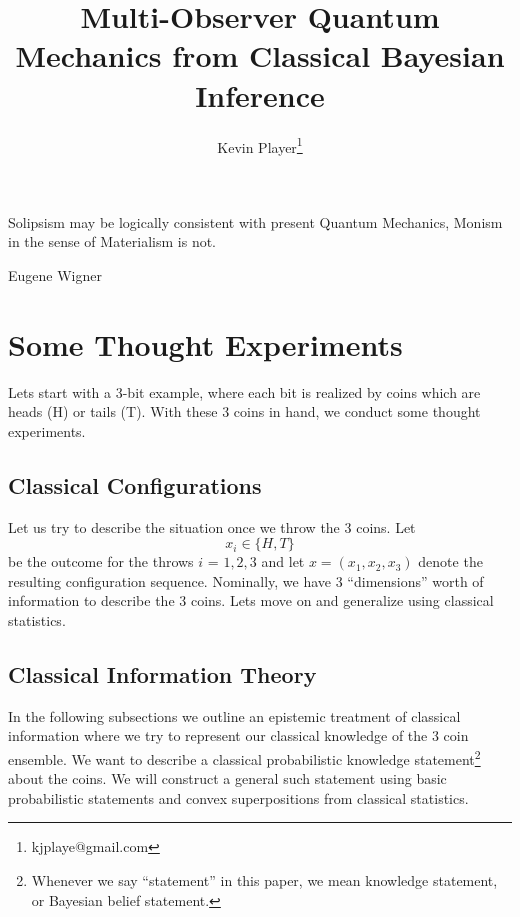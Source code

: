 \documentclass[12pt,a4paper]{article}
\begin{document}
\title{Multi-Observer Quantum Mechanics from Classical Bayesian Inference}
\author[1]{Kevin Player\footnote{kjplaye@gmail.com}}

\maketitle


\epigraph{Solipsism may be logically consistent with present Quantum Mechanics, Monism in the sense of Materialism is not.}{Eugene Wigner}


\section{Some Thought Experiments}
Lets start with a 3-bit example, where each bit is realized by coins which are heads (H) or tails (T).  With these 3 coins in hand, we conduct some thought experiments.
\subsection{Classical Configurations}
Let us try to describe the situation once we throw the 3 coins.  Let
\[
x_i \in \{H,T\}
\]
be the outcome for the throws $i$ = $1,2,3$ and let $x = (x_1, x_2, x_3)$ denote the resulting configuration sequence.  Nominally, we have 3 ``dimensions'' worth of information to describe the 3 coins.  Lets move on and generalize using classical statistics.
  
\subsection{Classical Information Theory}
In the following subsections we outline an epistemic treatment of classical information where we try to represent our classical knowledge of the 3 coin ensemble. We want to describe a classical probabilistic knowledge statement\footnote{Whenever we say ``statement'' in this paper, we mean knowledge statement, or Bayesian belief statement.} about the coins.  We will construct a general such statement using basic probabilistic statements and convex superpositions from classical statistics.
\end{document}

